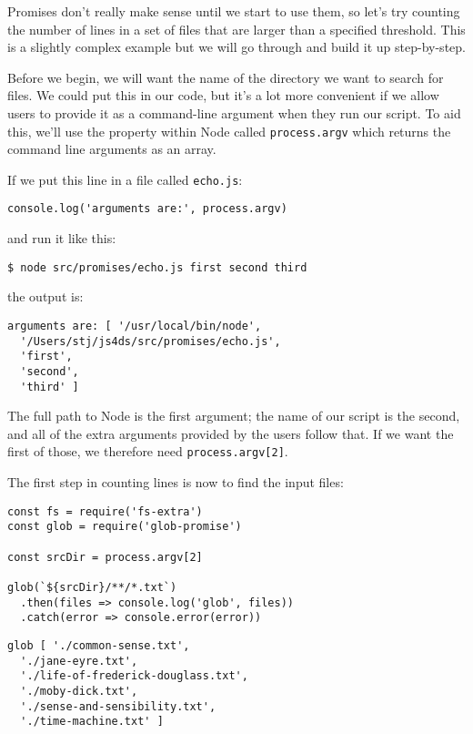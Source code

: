 Promises don't really make sense until we start to use them,
so let's try counting the number of lines in a set of files
that are larger than a specified threshold.
This is a slightly complex example but we will go through and build it up step-by-step.

Before we begin,
we will want the name of the directory we want to search for files.
We could put this in our code,
but it's a lot more convenient if we allow users to provide it as a command-line argument
when they run our script.
To aid this,
we'll use the property within Node called \texttt{process.argv}
which returns the command line arguments as an array.

If we put this line in a file called \texttt{echo.js}:

\begin{verbatim}
console.log('arguments are:', process.argv)
\end{verbatim}

\noindent
and run it like this:

\begin{verbatim}
$ node src/promises/echo.js first second third
\end{verbatim}

\noindent
the output is:

\begin{verbatim}
arguments are: [ '/usr/local/bin/node',
  '/Users/stj/js4ds/src/promises/echo.js',
  'first',
  'second',
  'third' ]
\end{verbatim}

\noindent
The full path to Node is the first argument;
the name of our script is the second,
and all of the extra arguments provided by the users follow that.
If we want the first of those,
we therefore need \texttt{process.argv[2]}.

The first step in counting lines is now to find the input files:

\begin{verbatim}
const fs = require('fs-extra')
const glob = require('glob-promise')

const srcDir = process.argv[2]

glob(`${srcDir}/**/*.txt`)
  .then(files => console.log('glob', files))
  .catch(error => console.error(error))
\end{verbatim}

\begin{verbatim}
glob [ './common-sense.txt',
  './jane-eyre.txt',
  './life-of-frederick-douglass.txt',
  './moby-dick.txt',
  './sense-and-sensibility.txt',
  './time-machine.txt' ]
\end{verbatim}

